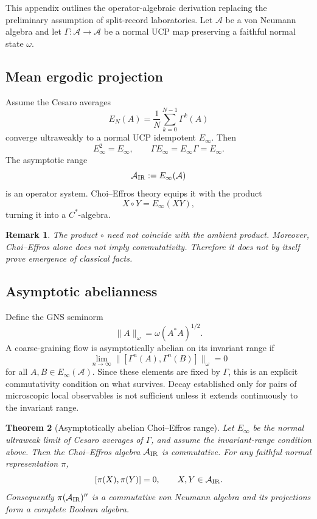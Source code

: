 \documentclass[11pt]{article}
\newtheorem{theorem}{Theorem}[section]
\newtheorem{remark}[theorem]{Remark}
\newcommand{\A}{\mathcal A}
\begin{document}
This appendix outlines the operator-algebraic derivation replacing the preliminary assumption of split-record laboratories.  Let $\A$ be a von Neumann algebra and let $\Gamma:\A\to\A$ be a normal UCP map preserving a faithful normal state $\omega$.

\subsection*{Mean ergodic projection}

Assume the Cesaro averages
\[
E_N(A)=\frac1N\sum_{k=0}^{N-1}\Gamma^k(A)
\]
converge ultraweakly to a normal UCP idempotent $E_\infty$.  Then
\[
E_\infty^2=E_\infty,
\qquad
\Gamma E_\infty=E_\infty\Gamma=E_\infty.
\]
The asymptotic range
\[
\A_{\rm IR}:=E_\infty(\A)
\]
is an operator system.  Choi--Effros theory
\cite{ChoiEffros1976,ChoiEffros1977} equips it with the product
\[
X\circ Y=E_\infty(XY),
\]
turning it into a $C^*$-algebra.

\begin{remark}
The product $\circ$ need not coincide with the ambient product.  Moreover, Choi--Effros alone does not imply commutativity.  Therefore it does not by itself prove emergence of classical facts.
\end{remark}

\subsection*{Asymptotic abelianness}

Define the GNS seminorm
\[
\|A\|_\omega=\omega(A^*A)^{1/2}.
\]
A coarse-graining flow is asymptotically abelian on its invariant range if
\[
\lim_{n\to\infty}\|[\Gamma^n(A),\Gamma^n(B)]\|_\omega=0
\]
for all \(A,B\in E_\infty(\A)\).  Since these elements are fixed by
\(\Gamma\), this is an explicit commutativity condition on what survives.
Decay established only for pairs of microscopic local observables is not
sufficient unless it extends continuously to the invariant range.

\begin{theorem}[Asymptotically abelian Choi--Effros range]
Let $E_\infty$ be the normal ultraweak limit of Cesaro averages of $\Gamma$,
and assume the invariant-range condition above.  Then the
Choi--Effros algebra \(\A_{\rm IR}\) is commutative.  For any faithful normal
representation \(\pi\),
\[
[\pi(X),\pi(Y)]=0,
\qquad X,Y\in\A_{\rm IR}.
\]
Consequently \(\pi(\A_{\rm IR})''\) is a commutative von Neumann algebra and
its projections form a complete Boolean algebra.
\end{theorem}
\end{document}
